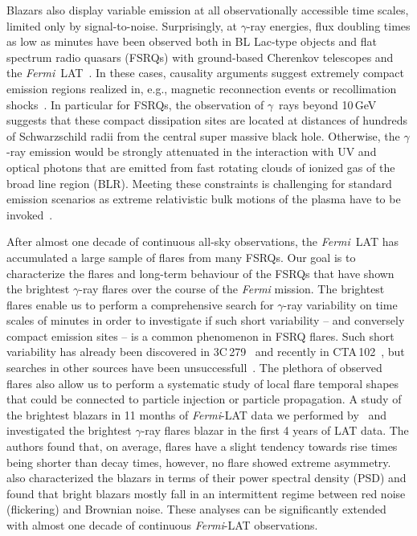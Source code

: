 \documentclass[twocolumn]{aastex62}
\newcommand{\Grays}{$\gamma$~rays\xspace}
\newcommand{\gray}{$\gamma$-ray\xspace}
\newcommand{\Fermi}{\emph{Fermi}\xspace}
\newcommand{\FermiLAT}{\emph{Fermi}~LAT\xspace}
\newcommand{\fermiLAT}{\emph{Fermi}-LAT\xspace}
\begin{document}
Blazars also display variable emission at all observationally accessible time scales, limited only by signal-to-noise.
Surprisingly, at \gray energies, flux doubling times as low as minutes have been observed both in BL Lac-type objects and flat spectrum radio quasars (FSRQs) with ground-based Cherenkov telescopes and the \FermiLAT~\cite[e.g.][]{pks2155hess2007,pks1222magic2011,TheFermi-LAT:2016dss}.
In these cases, causality arguments suggest extremely compact emission regions realized in, e.g., magnetic reconnection events or recollimation shocks~\cite[e.g.][]{Petropoulou:2016xat,Bodo:2017qqn}.
In particular for FSRQs, the observation of \Grays beyond 10\,GeV suggests that these compact dissipation sites are located at distances of hundreds of Schwarzschild  radii from the central super massive black hole. 
Otherwise, the \gray emission would be strongly attenuated in the interaction with UV and optical photons that are emitted from fast rotating clouds of ionized gas of the broad line region (BLR). 
Meeting these constraints is challenging for standard emission scenarios as extreme relativistic bulk motions of the plasma have to be invoked~\cite[e.g.][]{TheFermi-LAT:2016dss}. 

After almost one decade of continuous all-sky observations, the \FermiLAT has accumulated a large sample of flares from many FSRQs.
Our goal is to characterize the flares and long-term behaviour of the FSRQs that have shown the brightest \gray flares over the course of the \Fermi mission. 
The brightest flares enable us to perform a comprehensive search for \gray variability on time scales of minutes in order to investigate if such short variability -- and conversely compact emission sites -- is a common phenomenon 
in FSRQ flares. 
Such short variability has already been discovered in 3C\,279~\citep{TheFermi-LAT:2016dss} and recently in CTA\,102~\citep{2018ApJ...854L..26S}, but searches in other sources have been unsuccessfull~\citep{2017Galax...5..100N}.
The plethora of observed flares also allow us to perform a systematic study of local flare temporal shapes that could be connected to particle injection or particle propagation.
A study of the brightest blazars in 11 months of \fermiLAT data we performed by~\citet{2010ApJ...722..520A}
and \citet{2013MNRAS.430.1324N} investigated the brightest \gray flares blazar in the first 4 years of LAT data.
The authors found that, on average, flares have a slight tendency towards rise times being shorter than decay times, however, no flare showed extreme asymmetry. 
\citet{2010ApJ...722..520A} also characterized the blazars in terms of their power spectral density (PSD) and found that bright blazars mostly fall in an intermittent regime between red noise (flickering) and Brownian noise. 
These analyses can be significantly extended with almost one decade of continuous \fermiLAT observations.
\end{document}
